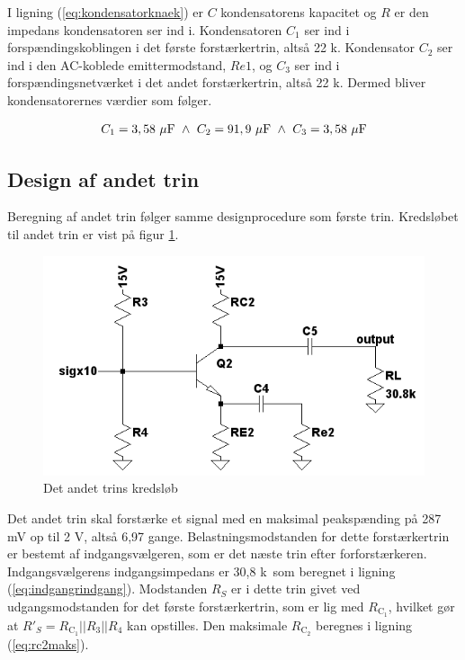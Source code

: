 I ligning (\ref{eq:kondensatorknaek}) er $C$ kondensatorens kapacitet og $R$ er den impedans kondensatoren ser ind i. Kondensatoren $C_1$ ser ind i forspændingskoblingen i det første forstærkertrin, altså 22 k\ohm. Kondensator $C_2$ ser ind i den AC-koblede emittermodstand, $Re1$, og $C_3$ ser ind i forspændingsnetværket i det andet forstærkertrin, altså 22 k\ohm. Dermed bliver kondensatorernes værdier som følger.

\begin{equation}
C_1=3,58~\mathrm{\mu F}~\wedge ~C_2=91,9~\mathrm{\mu F}~\wedge ~C_3=3,58~\mathrm{\mu F}
\end{equation}



\subsection*{Design af andet trin}
Beregning af andet trin følger samme designprocedure som første trin. Kredsløbet til andet trin er vist på figur \ref{fig:andettrinkreds}.

\begin{figure}[h]
\centering
\includegraphics[scale=.6]{teknisk/forforstaerker/andettrinkreds.png}
\caption{Det andet trins kredsløb}
\label{fig:andettrinkreds}
\end{figure}

Det andet trin skal forstærke et signal med en maksimal peakspænding på 287 mV op til 2 V, altså 6,97 gange. Belastningsmodstanden for dette forstærkertrin er bestemt af indgangsvælgeren, som er det næste trin efter forforstærkeren. Indgangsvælgerens indgangsimpedans er 30,8 k\ohm~som beregnet i ligning (\ref{eq:indgangrindgang}). Modstanden $R_S$ er i dette trin givet ved udgangsmodstanden for det første forstærkertrin, som er lig med $R_{\mathrm{C_1}}$, hvilket gør at $R'_S = R_{\mathrm{C_1}} || R_3 || R_4$ kan opstilles. Den maksimale $R_{\mathrm{C_2}}$ beregnes i ligning (\ref{eq:rc2maks}).

